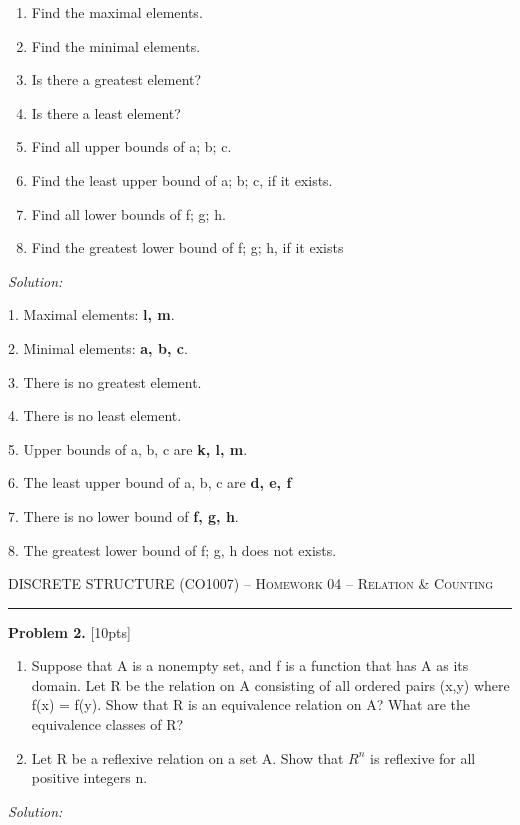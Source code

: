 \documentclass[12pt]{amsart}
\begin{document}
\begin{enumerate}
    \item Find the maximal elements.
    \item Find the minimal elements.
    \item Is there a greatest element?
    \item Is there a least element?
    \item Find all upper bounds of a; b; c.
    \item Find the least upper bound of a; b; c, if it exists.
    \item Find all lower bounds of f; g; h.
    \item Find the greatest lower bound of f; g; h, if it exists
\end{enumerate}

\bigskip
\textit{Solution:}
\medskip

1. Maximal elements: \textbf{l, m}.

2. Minimal elements: \textbf{a, b, c}.

3. There is no greatest element.

4. There is no least element.

5. Upper bounds of a, b, c are \textbf{k, l, m}.

6. The least upper bound of a, b, c are \textbf{d, e, f}

7. There is no lower bound of \textbf{f, g, h}.

8. The greatest lower bound of f; g, h does not exists.
\newpage

{\scshape } \hfill {\scshape DISCRETE STRUCTURE (CO1007) -- Homework 04 -- Relation \& Counting} \hfill {\scshape }
 
\smallskip

\hrule

\bigskip

\bigskip 

\textbf{Problem 2. }[10pts]
\begin{enumerate}
    \item Suppose that A is a nonempty set, and f is a function that has A as its domain. Let R be the relation on A consisting of all ordered pairs (x,y) where f(x) = f(y). Show that R is an equivalence relation on A? What are the equivalence classes of R?

    \item Let R be a reflexive relation on a set A. Show that $R^n$ is reflexive for all positive integers n.
\end{enumerate}
\bigskip
\textit{Solution:}
\medskip
\end{document}
